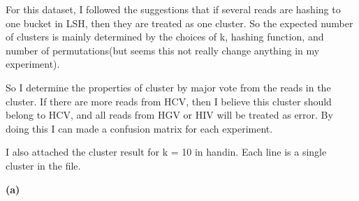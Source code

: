 \documentclass[11pt]{article}
\renewcommand\part[1]{\vspace{.10in}\textbf{(#1)}}
\begin{document}
For this dataset, I followed the suggestions that if several reads are hashing to one bucket in LSH, then they are treated as one cluster. So the expected number of clusters is mainly determined by the choices of k, hashing function, and number of permutations(but seems this not really change anything in my experiment).

So I determine the properties of cluster by major vote from the reads in the cluster. If there are more reads from HCV, then I believe this cluster should belong to HCV, and all reads from HGV or HIV will be treated as error. By doing this I can made a confusion matrix for each experiment.

I also attached the cluster result for k = 10 in handin. Each line is a single cluster in the file.

\part{a}
\end{document}
